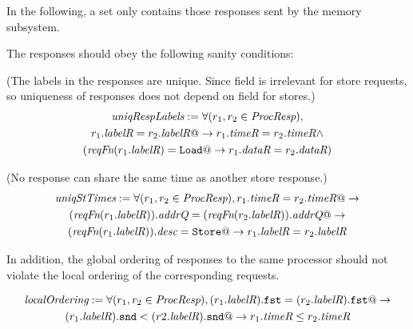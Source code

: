 In the following, a \Response{} set only contains those responses sent by the
memory subsystem.

The responses should obey the following sanity conditions:

\begin{defn} (The labels in the responses are unique. Since \dataR{} field is
irrelevant for store requests, so uniqueness of responses does not depend on
\dataR{} field for stores.)
\small
\begin{multline*}
\textit{uniqRespLabels} := \forall (r_1, r_2 \in \textit{ProcResp}),\\
r_1.\textit{labelR} = r_2.\textit{labelR} @-> r_1.\textit{timeR} = r_2.\textit{timeR} \wedge\\
(\textit{reqFn}(r_1.\textit{labelR}) = \texttt{Load} @-> r_1.\textit{dataR} = r_2.\textit{dataR})
\end{multline*}
\end{defn}

\begin{defn} (No response can share the same time as another store response.)
\small
\begin{multline*}
\textit{uniqStTimes} := 
\forall (r_1, r_2 \in \textit{ProcResp}),
r_1.\textit{timeR} = r_2.\textit{timeR} @-> \\
(\textit{reqFn} (r_1.\textit{labelR})).\textit{addrQ} = (\textit{reqFn} (r_2.\textit{labelR})).\textit{addrQ} @->\\
(\textit{reqFn} (r_1.\textit{labelR})).\textit{desc} = \texttt{Store} @->
r_1.\textit{labelR} = r_2.\textit{labelR}
\end{multline*}
\end{defn}

In addition, the global ordering of responses to the same processor should not
violate the local ordering of the corresponding requests.
\begin{defn}
\small
\begin{multline*}
\textit{localOrdering} :=
\forall (r_1, r_2 \in \textit{ProcResp}), (r_1.\textit{labelR}).\texttt{fst} = (r_2.\textit{labelR}).\texttt{fst} @->\\
(r_1.\textit{labelR}).\texttt{snd} < (r2.\textit{labelR}).\texttt{snd} @-> r_1.\textit{timeR} \le r_2.\textit{timeR}
\end{multline*}
\end{defn}

